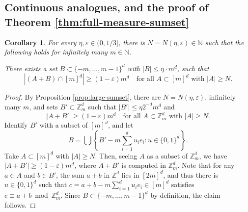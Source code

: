 \documentclass[12pt]{amsart}
\newcommand{\e}{\varepsilon}
\newtheorem{corollary}[theorem]{Corollary}
\def\Z{{\mathbb{Z}}}
\def\N{{\mathbb{N}}}
\numberwithin{theorem}{section}
\numberwithin{equation}{section}
\begin{document}
\subsection{Continuous analogues, and the proof of Theorem \ref{thm:full-measure-sumset}}

\begin{corollary} \label{cor:large-sum-Z^d}
    For every $\eta,\e\in (0,1/3]$, there is $N=N(\eta,\e)\in\N$ such that the following holds for infinitely many $m\in\N$.

    There exists a set $B\subset \{ -m,\ldots, m-1\}^d$ with $|B|\le \eta\cdot  m^d$, such that
    \[
        \left|(A+B)\cap [m]^d\right| \ge (1-\e) m^d \quad\text{for all } A\subset [m]^d \text{ with } |A|\ge N.
    \]
\end{corollary}
\begin{proof}
    By Proposition \ref{prop:large-sumset}, there are $N=N(\eta,\e)$, infinitely many $m$, and sets $B'\subset \Z_m^d$ such that $|B'|\le \eta 2^{-d} m^d$ and
    \[
        |A+B'| \ge (1-\e) m^d \quad\text{for all } A\subset \Z_m^d \text{ with } |A|\ge N.
    \]
    Identify $B'$ with a subset of $[m]^d$, and let 
    \[
        B= \bigcup\left\{ B'- m \sum_{i=1}^d  u_i e_i : u\in \{0,1\}^d \right\}.
    \]
    Take $A\subset [m]^d$ with $|A|\ge N$. Then, seeing $A$ as a subset of $\Z_m^d$, we have $|A+B'|\ge (1-\e)m^d$, where $A+B'$ is computed in $\Z_m^d$. Note that for any $a\in A$ and $b\in B'$, the sum $a+b$ in $\Z^d$ lies in $[2m]^d$, and thus there is $u\in\{0,1\}^d$ such that $c=  a+b - m\sum_{i=1}^d u_i e_i \in [m]^d$ satisfies $c\equiv a+b \bmod \Z_m^d$. Since $B\subset \{ -m,\ldots, m-1\}^d$ by definition, the claim follows.
\end{proof}
\end{document}
